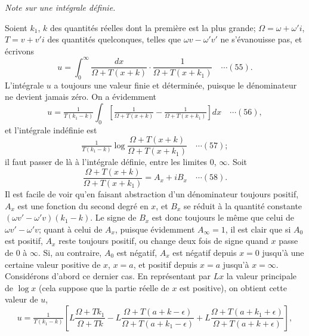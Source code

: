\documentclass[12pt,a4paper]{article}
\begin{document}
\bigskip
\begin{center}
\textit{Note sur une int\'egrale d\'efinie.}
\end{center}

Soient $k_1$, $k$ des quantit\'es r\'eelles dont la premi\`ere est la plus grande; $\Omega = \omega + \omega' i$, $T = v + v' i$ des quantit\'es quelconques, telles que $\omega v - \omega' v'$ ne s'\'evanouisse pas, et \'ecrivons
\[
u = \int_0^{\infty}\frac{dx}{\Omega + T(x + k)} \cdot \frac{1}{\Omega + T(x + k_1)} \quad\cdots(55).
\]
L'int\'egrale $u$ a toujours une valeur finie et d\'etermin\'ee, puisque le d\'enominateur ne devient jamais z\'ero. On a \'evidemment
\[
u = \tfrac{1}{T(k_1 - k)}\int_0\left[\tfrac{1}{\Omega + T(x + k)} - \tfrac{1}{\Omega + T(x + k_1)}\right]dx \quad\cdots(56),
\]
et l'int\'egrale ind\'efinie est
\[
\tfrac{1}{T(k_1 - k)}\log\frac{\Omega + T(x + k)}{\Omega + T(x + k_1)} \quad\cdots(57);
\]
il faut passer de l\`a \`a l'int\'egrale d\'efinie, entre les limites $0$, $\infty$. Soit
\[
\frac{\Omega + T(x + k)}{\Omega + T(x + k_1)} = A_x + iB_x \quad\cdots(58).
\]
Il est facile de voir qu'en faisant abstraction d'un d\'enominateur toujours positif, $A_x$ est une fonction du second degr\'e en $x$, et $B_x$ se r\'eduit \`a la quantit\'e constante $(\omega v' - \omega' v)(k_1 - k)$. Le signe de $B_x$ est donc toujours le m\^eme que celui de $\omega v' - \omega' v$; quant \`a celui de $A_x$, puisque \'evidemment $A_{\infty} = 1$, il est clair que si $A_0$ est positif, $A_x$ reste toujours positif, ou change deux fois de signe quand $x$ passe de $0$ \`a $\infty$. Si, au contraire, $A_0$ est n\'egatif, $A_x$ est n\'egatif depuis $x = 0$ jusqu'\`a une certaine valeur positive de $x$, $x = a$, et positif depuis $x = a$ jusqu'\`a $x = \infty$. Consid\'erons d'abord ce dernier cas. En repr\'esentant par $Lx$ la valeur principale de $\log x$ (cela suppose que la partie r\'eelle de $x$ est positive), on obtient cette valeur de $u$,
\[
u = \tfrac{1}{T(k_1 - k)}\left[L\frac{\Omega + T k_1}{\Omega + Tk} - L\frac{\Omega + T(a + k - \epsilon)}{\Omega + T(a + k_1 - \epsilon)} + L\frac{\Omega + T(a + k_1 + \epsilon)}{\Omega + T(a + k + \epsilon)}\right],
\]

\newpage
\setcounter{page}{182}
\end{document}
